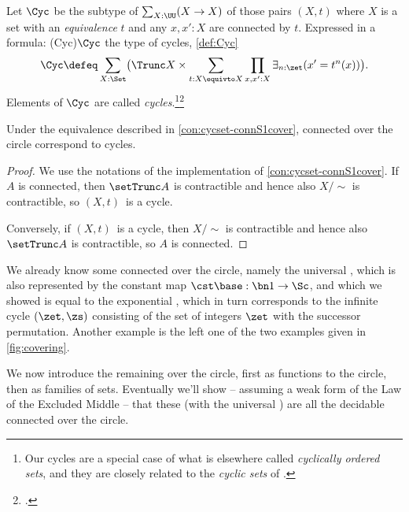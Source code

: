\begin{definition}\label{def:Cyc}
  Let $\Cyc$ be the subtype of $\sum_{X:\UU}(X\to X)$ of those
  pairs $(X,t)$ where $X$ is a \emph{\nonempty} set with an 
  \emph{equivalence} $t$ and any $x,x':X$ are connected by $t$.
  Expressed in a formula: \glossary(Cyc){$\protect\Cyc$}%
  {the type of cycles, \cref{def:Cyc}} 
\[
\Cyc \defeq \sum_{X:\Set}\bigl( {\Trunc X} \times \sum_{t:X\equivto X}
            \prod_{x,x':X}\exists_{n:\zet}(x'=t^n(x))\bigr).
\]
  Elements of $\Cyc$ are called \emph{cycles}.\footnote{%
    Our cycles are a special case of what is elsewhere called
    \emph{cyclically ordered sets},
    and they are closely related to the \emph{cyclic sets} of
    \citeauthor{Connes1983}\footnotemark{}.}\footcitetext{Connes1983}
\end{definition}
\begin{corollary}\label{thm:cycset-connS1cover}
  Under the equivalence described in \cref{con:cycset-connS1cover},
  connected \coverings over the circle correspond to cycles.
\end{corollary}
\begin{proof}
  We use the notations of the implementation of \cref{con:cycset-connS1cover}.
  If $A$ is connected, then $\setTrunc A$ is contractible and hence also
  $X/\sim$ is contractible, so $(X,t)$ is a cycle.
  
  Conversely, if $(X,t)$ is a cycle, then $X/\sim$ is contractible
  and hence also $\setTrunc A$ is contractible, so $A$ is connected. 
\end{proof}
  
We already know some connected \coverings over the circle, 
namely the universal \covering, which is also represented by 
the constant map $\cst\base:\bn 1\to\Sc$, and which we showed 
is equal to the exponential \covering, which in turn corresponds 
to the infinite cycle $(\zet,\zs)$
consisting of the set of integers $\zet$ with the successor permutation.
Another example is the left one of the two examples given in
\cref{fig:covering}.

We now introduce the remaining \coverings over the circle, first as functions to the circle, then as families of sets.
Eventually we'll show -- assuming a weak form
of the Law of the Excluded Middle -- that these (with the universal \covering)
are all the decidable connected \coverings over the circle.

